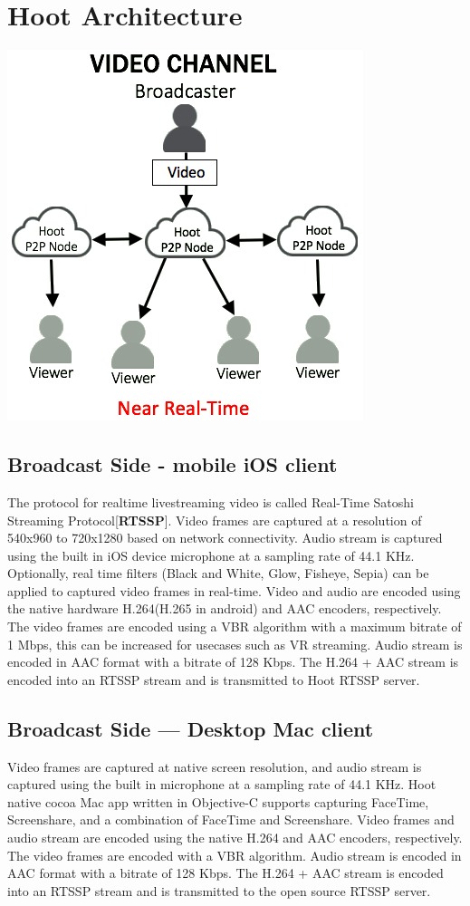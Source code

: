 \section{Hoot Architecture}

\includegraphics[scale=0.5]{static/hoot-video-architecture-channel-trans}

\subsection{Broadcast Side - mobile iOS client}
The protocol for realtime livestreaming video is called Real-Time Satoshi Streaming Protocol[\textbf{RTSSP}].
Video frames are captured at a resolution of 540x960 to 720x1280 based on network connectivity. Audio stream is captured using the built in iOS device microphone at a sampling rate of 44.1 KHz. Optionally, real time filters (Black and White, Glow, Fisheye, Sepia) can be applied to captured video frames in real-time. Video and audio are encoded using the native hardware H.264(H.265 in android) and AAC encoders, respectively. The video frames are encoded using a VBR algorithm with a maximum bitrate of 1 Mbps, this can be increased for usecases such as VR streaming. Audio stream is encoded in AAC format with a bitrate of 128 Kbps. The H.264 + AAC stream is encoded into an RTSSP stream and is transmitted to Hoot RTSSP server.

\subsection{Broadcast Side — Desktop Mac client}
Video frames are captured at native screen resolution, and audio stream is captured using the built in microphone at a sampling rate of 44.1 KHz. Hoot native cocoa Mac app written in Objective-C supports capturing FaceTime, Screenshare, and a combination of FaceTime and Screenshare. Video frames and audio stream are encoded using the native H.264 and AAC encoders, respectively. The video frames are encoded with a VBR algorithm. Audio stream is encoded in AAC format with a bitrate of 128 Kbps. The H.264 + AAC stream is encoded into an RTSSP stream and is transmitted to the open source RTSSP server.

